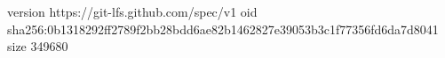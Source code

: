 version https://git-lfs.github.com/spec/v1
oid sha256:0b1318292ff2789f2bb28bdd6ae82b1462827e39053b3c1f77356fd6da7d8041
size 349680
